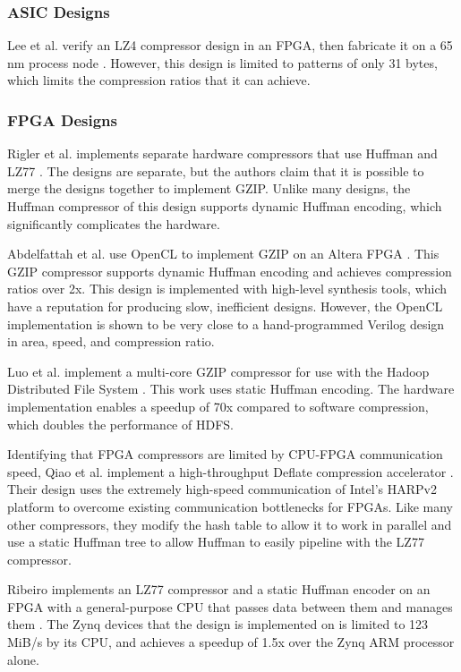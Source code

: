 \documentclass[doublespace,nopageskip]{VTthesis}
\begin{document}
\subsubsection{ASIC Designs}\label{sss:asic_compressor_designs}
Lee et al. verify an LZ4 compressor design in an FPGA, then fabricate it on a 65 nm process node \cite{hardwarelz4}. However, this design is limited to patterns of only 31 bytes, which limits the compression ratios that it can achieve.

\subsubsection{FPGA Designs}\label{sss:fpga_compressor_designs}
Rigler et al. implements separate hardware compressors that use Huffman and LZ77 \cite{fpgahuffmanlz77}. The designs are separate, but the authors claim that it is possible to merge the designs together to implement GZIP. Unlike many designs, the Huffman compressor of this design supports dynamic Huffman encoding, which significantly complicates the hardware.

Abdelfattah et al. use OpenCL to implement GZIP on an Altera FPGA \cite{gziponachip}. This GZIP compressor supports dynamic Huffman encoding and achieves compression ratios over 2x. This design is implemented with high-level synthesis tools, which have a reputation for producing slow, inefficient designs. However, the OpenCL implementation is shown to be very close to a hand-programmed Verilog design in area, speed, and compression ratio.

Luo et al. implement a multi-core GZIP compressor for use with the Hadoop Distributed File System \cite{hdfsgzip}. This work uses static Huffman encoding. The hardware implementation enables a speedup of 70x compared to software compression, which doubles the performance of HDFS.

Identifying that FPGA compressors are limited by CPU-FPGA communication speed, Qiao et al. implement a high-throughput Deflate compression accelerator \cite{fpgadeflate}. Their design uses the extremely high-speed communication of Intel's HARPv2 platform to overcome existing communication bottlenecks for FPGAs. Like many other compressors, they modify the hash table to allow it to work in parallel and use a static Huffman tree to allow Huffman to easily pipeline with the LZ77 compressor.

Ribeiro implements an LZ77 compressor and a static Huffman encoder on an FPGA with a general-purpose CPU that passes data between them and manages them \cite{ribeiro}. The Zynq devices that the design is implemented on is limited to 123 MiB/s by its CPU, and achieves a speedup of 1.5x over the Zynq ARM processor alone.
\end{document}
